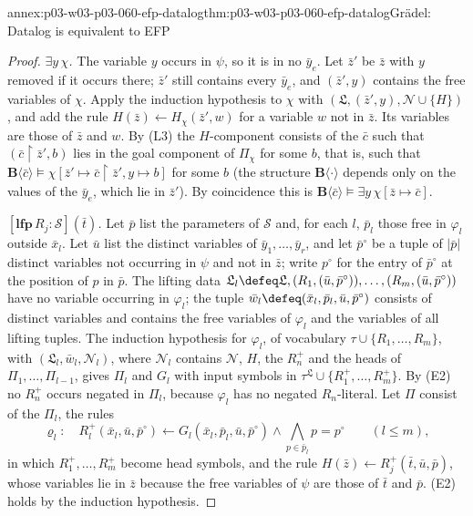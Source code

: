 \begin{annexitem}{annex:p03-w03-p03-060-efp-datalog}{thm:p03-w03-p03-060-efp-datalog}{Gr\"adel: Datalog is equivalent to EFP}
\begin{proof}
\emph{\(\exists y\,\chi\).} The variable \(y\) occurs in \(\psi\), so it is
in no \(\bar y_e\). Let \(\bar z'\) be \(\bar z\) with \(y\) removed if it
occurs there; \(\bar z'\) still contains every \(\bar y_e\), and
\((\bar z',y)\) contains the free variables of \(\chi\). Apply the
induction hypothesis to \(\chi\) with \((\mathfrak L,(\bar z',y),\mathcal N\cup\{H\})\),
and add the rule \(H(\bar z)\leftarrow H_\chi(\bar z',w)\) for a variable
\(w\) not in \(\bar z\). Its variables are those of \(\bar z\) and \(w\).
By (L3) the \(H\)-component consists of the \(\bar c\) such that
\((\bar c\restriction\bar z',b)\) lies in the goal component of \(\Pi_\chi\)
for some \(b\), that is, such that
\(\mathbf B\langle\bar c\rangle\models\chi[\bar z'\mapsto\bar c\restriction\bar z',y\mapsto b]\)
for some \(b\) (the structure \(\mathbf B\langle\cdot\rangle\) depends only
on the values of the \(\bar y_e\), which lie in \(\bar z'\)). By
coincidence this is \(\mathbf B\langle\bar c\rangle\models\exists y\,\chi[\bar z\mapsto\bar c]\).

\emph{\([\mathbf{lfp}\,R_j:\mathcal S](\bar t)\).} Let \(\bar p\) list the
parameters of \(\mathcal S\) and, for each \(l\), \(\bar p_l\) those free in
\(\varphi_l\) outside \(\bar x_l\). Let \(\bar u\) list the distinct
variables of \(\bar y_1,\ldots,\bar y_r\), and let \(\bar p^\circ\) be a
tuple of \(|\bar p|\) distinct variables not occurring in \(\psi\) and not
in \(\bar z\); write \(p^\circ\) for the entry of \(\bar p^\circ\) at the
position of \(p\) in \(\bar p\). The lifting data
\(\mathfrak L_l\defeq\mathfrak L,(R_1,(\bar u,\bar p^\circ)),\ldots,(R_m,(\bar u,\bar p^\circ))\)
have no variable occurring in \(\varphi_l\); the tuple
\(\bar w_l\defeq(\bar x_l,\bar p_l,\bar u,\bar p^\circ)\) consists of
distinct variables and contains the free variables of \(\varphi_l\) and the
variables of all lifting tuples. The induction hypothesis for \(\varphi_l\),
of vocabulary \(\tau\cup\{R_1,\ldots,R_m\}\), with
\((\mathfrak L_l,\bar w_l,\mathcal N_l)\), where \(\mathcal N_l\) contains
\(\mathcal N\), \(H\), the \(R_n^+\) and the heads of
\(\Pi_1,\ldots,\Pi_{l-1}\), gives \(\Pi_l\) and \(G_l\) with input symbols
in \(\tau^{\mathfrak L}\cup\{R_1^+,\ldots,R_m^+\}\). By (E2) no \(R_n^+\)
occurs negated in \(\Pi_l\), because \(\varphi_l\) has no negated
\(R_n\)-literal. Let \(\Pi\) consist of the \(\Pi_l\), the rules
\[
 \varrho_l:\quad R_l^+(\bar x_l,\bar u,\bar p^\circ)\leftarrow G_l(\bar x_l,\bar p_l,\bar u,\bar p^\circ)\wedge\textstyle\bigwedge_{p\in\bar p_l}p=p^\circ\qquad(l\le m),
\]
in which \(R_1^+,\ldots,R_m^+\) become head symbols, and the rule
\(H(\bar z)\leftarrow R_j^+(\bar t,\bar u,\bar p)\), whose variables lie in
\(\bar z\) because the free variables of \(\psi\) are those of \(\bar t\)
and \(\bar p\). (E2) holds by the induction hypothesis.


\end{proof}
\end{annexitem}
